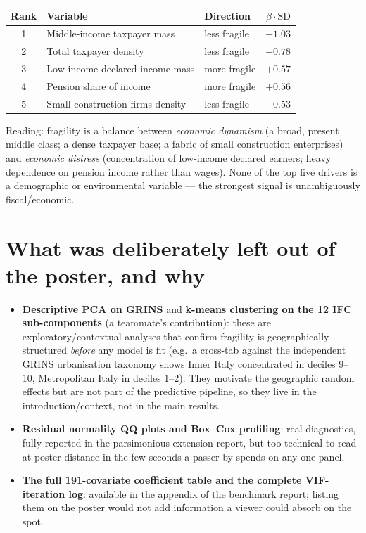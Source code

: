 \documentclass[11pt,a4paper]{article}
\begin{document}
\begin{center}
\begin{tabular}{@{}cllr@{}}
\toprule
Rank & Variable & Direction & $\beta \cdot \mathrm{SD}$ \\
\midrule
1 & Middle-income taxpayer mass        & less fragile & $-1.03$ \\
2 & Total taxpayer density             & less fragile & $-0.78$ \\
3 & Low-income declared income mass    & more fragile  & $+0.57$ \\
4 & Pension share of income            & more fragile  & $+0.56$ \\
5 & Small construction firms density   & less fragile  & $-0.53$ \\
\bottomrule
\end{tabular}
\end{center}

Reading: fragility is a balance between \emph{economic dynamism}
(a broad, present middle class; a dense taxpayer base; a fabric of
small construction enterprises) and \emph{economic distress}
(concentration of low-income declared earners; heavy dependence on
pension income rather than wages). None of the top five drivers is
a demographic or environmental variable --- the strongest signal is
unambiguously fiscal/economic.

\section{What was deliberately left out of the poster, and why}

\begin{itemize}[leftmargin=2em]
  \item \textbf{Descriptive PCA on GRINS} and \textbf{k-means
  clustering on the 12 IFC sub-components} (a teammate's
  contribution): these are exploratory/contextual analyses that
  confirm fragility is geographically structured \emph{before} any
  model is fit (e.g.\ a cross-tab against the independent GRINS
  urbanisation taxonomy shows Inner Italy concentrated in deciles
  9--10, Metropolitan Italy in deciles 1--2). They motivate the
  geographic random effects but are not part of the predictive
  pipeline, so they live in the introduction/context, not in the
  main results.
  \item \textbf{Residual normality QQ plots and Box--Cox profiling}:
  real diagnostics, fully reported in the parsimonious-extension
  report, but too technical to read at poster distance in the few
  seconds a passer-by spends on any one panel.
  \item \textbf{The full 191-covariate coefficient table and the
  complete VIF-iteration log}: available in the appendix of the
  benchmark report; listing them on the poster would not add
  information a viewer could absorb on the spot.
\end{itemize}
\end{document}
